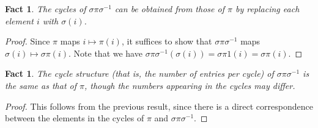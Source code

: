 \documentclass{book}
\theoremstyle{plain}
\newtheorem{fact}[theorem]{Fact}
\theoremstyle{definition}
\begin{document}
\begin{fact}
The cycles of $\sigma\pi\sigma^{-1}$ can be obtained from those of $\pi$ by replacing each element $i$ with $\sigma(i)$.
\end{fact}

\begin{proof}
Since $\pi$ maps $i \mapsto \pi(i)$, it suffices to show that $\sigma\pi\sigma^{-1}$ maps $\sigma(i) \mapsto \sigma\pi(i)$. Note that we have $\sigma\pi\sigma^{-1}(\sigma(i)) = \sigma\pi 1(i) = \sigma\pi(i)$.
\end{proof}

\begin{fact}
The cycle structure (that is, the number of entries per cycle) of $\sigma\pi\sigma^{-1}$ is the same as that of $\pi$, though the numbers appearing in the cycles may differ.
\end{fact}

\begin{proof}
This follows from the previous result, since there is a direct correspondence between the elements in the cycles of $\pi$ and $\sigma\pi\sigma^{-1}$.
\end{proof}
\end{document}
